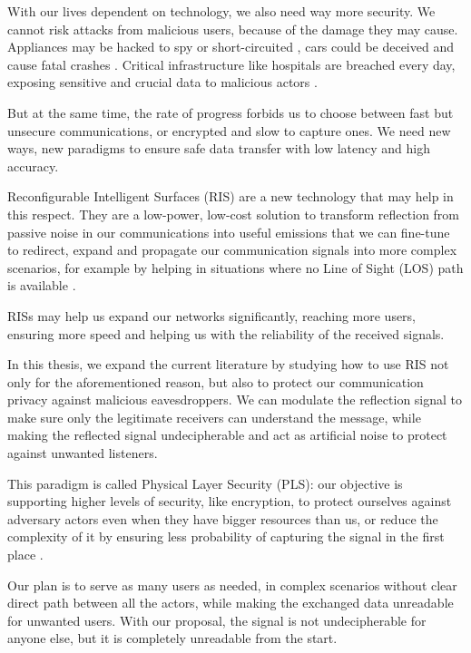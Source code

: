 With our lives dependent on technology, we also need way more security. We cannot risk attacks from malicious users, because of the damage they may cause. Appliances may be hacked to spy or short-circuited \cite{Inside-the-Smart-Home-IoT-Device-Threats-and-Attack-Scenarios}, cars could be deceived and cause fatal crashes \cite{CAV-attack}. Critical infrastructure like hospitals are breached every day, exposing sensitive and crucial data to malicious actors \cite{Cyberattacks-in-healthcare}.

But at the same time, the rate of progress forbids us to choose between fast but unsecure communications, or encrypted and slow to capture ones. We need new ways, new paradigms to ensure safe data transfer with low latency and high accuracy.

Reconfigurable Intelligent Surfaces (RIS) are a new technology that may help in this respect. They are a low-power, low-cost solution to transform reflection from passive noise in our communications into useful emissions that we can fine-tune to redirect, expand and propagate our communication signals into more complex scenarios, for example by helping in situations where no Line of Sight (LOS) path is available \cite{SEGATA2024110443}.

RISs may help us expand our networks significantly, reaching more users, ensuring more speed and helping us with the reliability of the received signals.

In this thesis, we expand the current literature by studying how to use RIS not only for the aforementioned reason, but also to protect our communication privacy against malicious eavesdroppers. We can modulate the reflection signal to make sure only the legitimate receivers can understand the message, while making the reflected signal undecipherable and act as artificial noise to protect against unwanted listeners.

This paradigm is called Physical Layer Security (PLS): our objective is supporting higher levels of security, like encryption, to protect ourselves against adversary actors even when they have bigger resources than us, or reduce the complexity of it by ensuring less probability of capturing the signal in the first place \cite{5751298}.

Our plan is to serve as many users as needed, in complex scenarios without clear direct path between all the actors, while making the exchanged data unreadable for unwanted users. With our proposal, the signal is not undecipherable for anyone else, but it is completely unreadable from the start.

